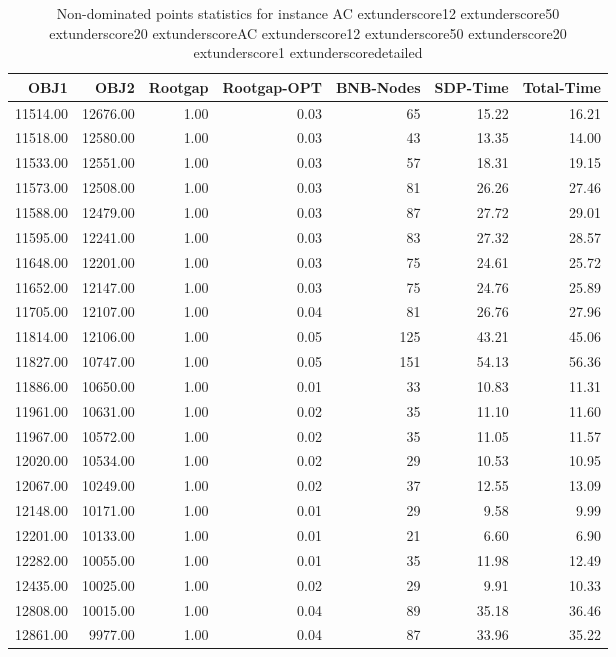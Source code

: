 \begin{table}
\caption{Non-dominated points statistics for instance AC	extunderscore12	extunderscore50	extunderscore20	extunderscoreAC	extunderscore12	extunderscore50	extunderscore20	extunderscore1	extunderscoredetailed}
\label{tab:stats/AC_12_50_20_AC_12_50_20_1_detailed}
\begin{tabular}{rrrrrrr}
\toprule
OBJ1 & OBJ2 & Rootgap & Rootgap-OPT & BNB-Nodes & SDP-Time & Total-Time \\
\midrule
11514.00 & 12676.00 & 1.00 & 0.03 & 65 & 15.22 & 16.21 \\
11518.00 & 12580.00 & 1.00 & 0.03 & 43 & 13.35 & 14.00 \\
11533.00 & 12551.00 & 1.00 & 0.03 & 57 & 18.31 & 19.15 \\
11573.00 & 12508.00 & 1.00 & 0.03 & 81 & 26.26 & 27.46 \\
11588.00 & 12479.00 & 1.00 & 0.03 & 87 & 27.72 & 29.01 \\
11595.00 & 12241.00 & 1.00 & 0.03 & 83 & 27.32 & 28.57 \\
11648.00 & 12201.00 & 1.00 & 0.03 & 75 & 24.61 & 25.72 \\
11652.00 & 12147.00 & 1.00 & 0.03 & 75 & 24.76 & 25.89 \\
11705.00 & 12107.00 & 1.00 & 0.04 & 81 & 26.76 & 27.96 \\
11814.00 & 12106.00 & 1.00 & 0.05 & 125 & 43.21 & 45.06 \\
11827.00 & 10747.00 & 1.00 & 0.05 & 151 & 54.13 & 56.36 \\
11886.00 & 10650.00 & 1.00 & 0.01 & 33 & 10.83 & 11.31 \\
11961.00 & 10631.00 & 1.00 & 0.02 & 35 & 11.10 & 11.60 \\
11967.00 & 10572.00 & 1.00 & 0.02 & 35 & 11.05 & 11.57 \\
12020.00 & 10534.00 & 1.00 & 0.02 & 29 & 10.53 & 10.95 \\
12067.00 & 10249.00 & 1.00 & 0.02 & 37 & 12.55 & 13.09 \\
12148.00 & 10171.00 & 1.00 & 0.01 & 29 & 9.58 & 9.99 \\
12201.00 & 10133.00 & 1.00 & 0.01 & 21 & 6.60 & 6.90 \\
12282.00 & 10055.00 & 1.00 & 0.01 & 35 & 11.98 & 12.49 \\
12435.00 & 10025.00 & 1.00 & 0.02 & 29 & 9.91 & 10.33 \\
12808.00 & 10015.00 & 1.00 & 0.04 & 89 & 35.18 & 36.46 \\
12861.00 & 9977.00 & 1.00 & 0.04 & 87 & 33.96 & 35.22 \\

\end{tabular}
\end{table}
